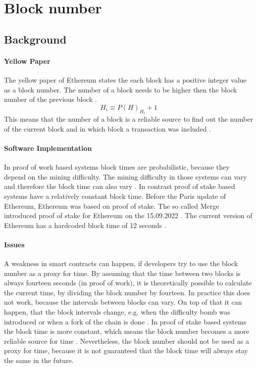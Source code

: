 \section{Block number}

\subsection{Background}

\paragraph{Yellow Paper}
The yellow paper of Ethereum states the each block has a positive integer value
as a block number. The number of a block needs to be higher then the block
number of the previous block \cite{ethyellowpaper2023}.
\begin{equation} \label{eq:blocknumber}
    H_i \equiv P(H)_{H_i} + 1
\end{equation}
This means that the number of a block is a reliable source to find out the
number of the current block and in which block a transaction was included
\cite{eth_blocks}.

\paragraph{Software Implementation}
In proof of work based systems block times are probabilistic, because they
depend on the mining difficulty. The mining difficulty in those systems can
vary and therefore the block time can also vary \cite{eth_blocks}. \newline In
contrast proof of stake based systems have a relatively constant block time.
Before the Paris update of Ethereum, Ethereum was based on proof of stake. The
so called Merge introduced proof of stake for Ethereum on the 15.09.2022
\cite{eth_history}. The current version of Ethereum has a hardcoded block time
of 12 seconds \cite{eth_blocks}. \newline

\paragraph{Issues}
A weakness in smart contracts can happen, if developers try to use the block
number as a proxy for time. By assuming that the time between two blocks is
always fourteen seconds (in proof of work), it is theoretically possible to
calculate the current time, by dividing the block number by fourteen. In
practice this does not work, because the intervals between blocks can vary. On
top of that it can happen, that the block intervals change, e.g. when the
difficulty bomb was introduced or when a fork of the chain is done
\cite{swc116}. \newline In proof of stake based systems the block time is more
constant, which means the block number becomes a more reliable source for time
\cite{bellatrix_specs}. Nevertheless, the block number should not be used as a
proxy for time, because it is not guaranteed that the block time will always
stay the same in the future.	

